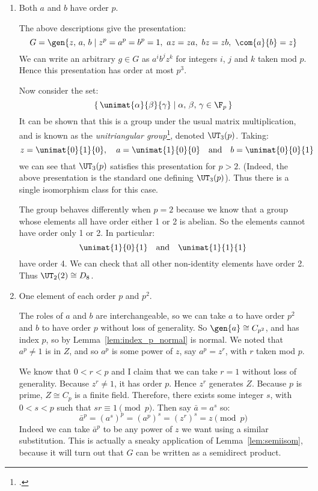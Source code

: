 \begin{enumerate}
    \item Both \(a\) and \(b\) have order \(p\).

        The above descriptions give the presentation:
        \[G = \gen{z,\,a,\,b \mid z^p = a^p = b^p = 1,\ az = za,\ bz = zb,\ \com{a}{b} = z}\]
        We can write an arbitrary \(g \in G\) as \(a^i b^j z^k\) for integers \(i\), \(j\) and \(k\) taken mod \(p\).
        Hence this presentation has order at most \(p^3\).

        Now consider the set:
        \[\left\{\,\unimat{\alpha}{\beta}{\gamma} \mid \alpha,\,\beta,\,\gamma \in \F_p\,\right\}\]
        It can be shown that this is a group under the usual matrix multiplication, and is known as the
        \emph{unitriangular group}\footcite{unitriangular}, denoted \(\UT_3(p)\).
        Taking:
        \[z = \unimat{0}{1}{0}, \quad a = \unimat{1}{0}{0} \quad \text{and} \quad b = \unimat{0}{0}{1}\]
        we can see that \(\UT_3(p)\) satisfies this presentation for \(p > 2\).
        (Indeed, the above presentation is the standard one defining \(\UT_3(p)\)).
        Thus there is a single isomorphism class for this case.

        The group behaves differently when \(p = 2\) because we know that a group whose elements all have order either 1
        or 2 is abelian.
        So the elements cannot have order only 1 or 2.
        In particular:
        \[\unimat{1}{0}{1} \quad \text{and} \quad \unimat{1}{1}{1}\]
        have order 4.
        We can check that all other non-identity elements have order 2.
        Thus \(\UT_2(2) \cong D_8\).
    \item One element of each order \(p\) and \(p^2\).

        The roles of \(a\) and \(b\) are interchangeable, so we can take \(a\) to have order \(p^2\) and \(b\) to have
        order \(p\) without loss of generality.
        So \(\gen{a} \cong C_{p^2}\), and has index \(p\), so by Lemma~\ref{lem:index_p_normal} is normal.
        We noted that \(a^p \neq 1\) is in \(Z\), and so \(a^p\) is some power of \(z\), say \(a^p = z^r\), with \(r\)
        taken mod \(p\).

        We know that \(0 < r < p\) and I claim that we can take \(r = 1\) without loss of generality.
        Because \(z^r \neq 1\), it has order \(p\).
        Hence \(z^r\) generates \(Z\).
        Because \(p\) is prime, \(Z \cong C_p\) is a finite field.
        Therefore, there exists some integer \(s\), with \(0 < s < p\) such that \(sr \equiv 1 \pmod{p}\).
        Then say \(\bar{a} = a^s\) so:
        \[\bar{a}^p = {(a^s)}^p = {(a^p)}^s = {(z^r)}^s = z \pmod{p}\]
        Indeed we can take \(\bar{a}^p\) to be any power of \(z\) we want using a similar substitution.
        This is actually a sneaky application of Lemma~\ref{lem:semiisom}, because it will turn out that \(G\) can be
        written as a semidirect product.


\end{enumerate}
